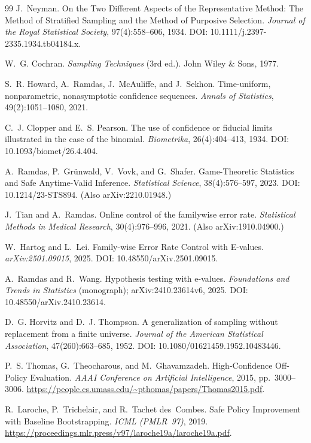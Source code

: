 \documentclass[11pt]{article}
\begin{document}
\begin{thebibliography}{99}\setlength{\itemsep}{0pt}
J.~Neyman.
On the Two Different Aspects of the Representative Method: The Method of Stratified Sampling and the Method of Purposive Selection.
\emph{Journal of the Royal Statistical Society}, 97(4):558--606, 1934.
DOI: 10.1111/j.2397-2335.1934.tb04184.x.

W.~G. Cochran.
\emph{Sampling Techniques} (3rd ed.).
John Wiley \& Sons, 1977.


S.~R. Howard, A.~Ramdas, J.~McAuliffe, and J.~Sekhon.
Time-uniform, nonparametric, nonasymptotic confidence sequences.
\emph{Annals of Statistics}, 49(2):1051--1080, 2021.

C.~J. Clopper and E.~S. Pearson.
The use of confidence or fiducial limits illustrated in the case of the binomial.
\emph{Biometrika}, 26(4):404--413, 1934. DOI: 10.1093/biomet/26.4.404.

A.~Ramdas, P.~Gr{\"u}nwald, V.~Vovk, and G.~Shafer.
Game-Theoretic Statistics and Safe Anytime-Valid Inference.
\emph{Statistical Science}, 38(4):576--597, 2023.
DOI: 10.1214/23-STS894. (Also arXiv:2210.01948.)

J.~Tian and A.~Ramdas.
Online control of the familywise error rate.
\emph{Statistical Methods in Medical Research}, 30(4):976--996, 2021. (Also arXiv:1910.04900.)

W.~Hartog and L.~Lei.
Family-wise Error Rate Control with E-values.
\emph{arXiv:2501.09015}, 2025. DOI: 10.48550/arXiv.2501.09015.

A.~Ramdas and R.~Wang.
Hypothesis testing with e-values.
\emph{Foundations and Trends in Statistics} (monograph); arXiv:2410.23614v6, 2025.
DOI: 10.48550/arXiv.2410.23614.

D.~G. Horvitz and D.~J. Thompson.
A generalization of sampling without replacement from a finite universe.
\emph{Journal of the American Statistical Association}, 47(260):663--685, 1952.
DOI: 10.1080/01621459.1952.10483446.

P.~S. Thomas, G.~Theocharous, and M.~Ghavamzadeh.
High-Confidence Off-Policy Evaluation.
\emph{AAAI Conference on Artificial Intelligence}, 2015, pp.~3000--3006.
\url{https://people.cs.umass.edu/~pthomas/papers/Thomas2015.pdf}.

R.~Laroche, P.~Trichelair, and R.~Tachet des~Combes.
Safe Policy Improvement with Baseline Bootstrapping.
\emph{ICML (PMLR~97)}, 2019.
\url{https://proceedings.mlr.press/v97/laroche19a/laroche19a.pdf}.


\end{thebibliography}
\end{document}
